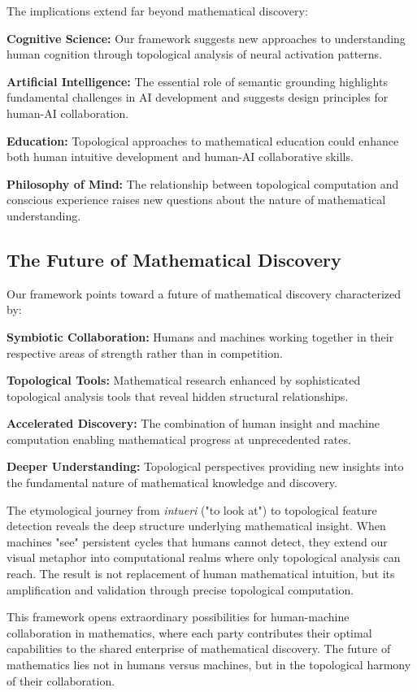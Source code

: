\documentclass[11pt]{article}
\begin{document}
The implications extend far beyond mathematical discovery:

\textbf{Cognitive Science:} Our framework suggests new approaches to understanding human cognition through topological analysis of neural activation patterns.

\textbf{Artificial Intelligence:} The essential role of semantic grounding highlights fundamental challenges in AI development and suggests design principles for human-AI collaboration.

\textbf{Education:} Topological approaches to mathematical education could enhance both human intuitive development and human-AI collaborative skills.

\textbf{Philosophy of Mind:} The relationship between topological computation and conscious experience raises new questions about the nature of mathematical understanding.

\subsection{The Future of Mathematical Discovery}

Our framework points toward a future of mathematical discovery characterized by:

\textbf{Symbiotic Collaboration:} Humans and machines working together in their respective areas of strength rather than in competition.

\textbf{Topological Tools:} Mathematical research enhanced by sophisticated topological analysis tools that reveal hidden structural relationships.

\textbf{Accelerated Discovery:} The combination of human insight and machine computation enabling mathematical progress at unprecedented rates.

\textbf{Deeper Understanding:} Topological perspectives providing new insights into the fundamental nature of mathematical knowledge and discovery.

The etymological journey from \emph{intueri} ("to look at") to topological feature detection reveals the deep structure underlying mathematical insight. When machines "see" persistent cycles that humans cannot detect, they extend our visual metaphor into computational realms where only topological analysis can reach. The result is not replacement of human mathematical intuition, but its amplification and validation through precise topological computation.

This framework opens extraordinary possibilities for human-machine collaboration in mathematics, where each party contributes their optimal capabilities to the shared enterprise of mathematical discovery. The future of mathematics lies not in humans versus machines, but in the topological harmony of their collaboration.
\end{document}
